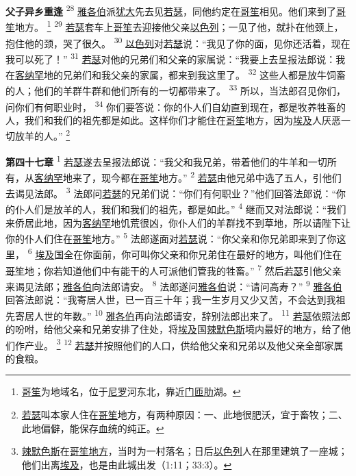 \textbf{父子异乡重逢\quad}
\textsuperscript{28}
\uline{雅各伯}派\uline{犹大}先去见\uline{若瑟}，同他约定在\uline{哥笙}相见。他们来到了\uline{哥笙}地方。
\footnote{\uline{哥笙}为地域名，位于\uline{尼罗}河东北，靠近\uline{门匝肋}湖。}
\textsuperscript{29}
\uline{若瑟}套车上\uline{哥笙}去迎接他父亲\uline{以色列}；一见了他，就扑在他颈上，抱住他的颈，哭了很久。
\textsuperscript{30}
\uline{以色列}对\uline{若瑟}说：“我见了你的面，见你还活着，现在我可以死了！”
\textsuperscript{31}
\uline{若瑟}对他的兄弟们和父亲的家属说：“我要上去呈报法郎说：我在\uline{客纳罕}地的兄弟们和我父亲的家属，都来到我这里了。
\textsuperscript{32}
这些人都是放牛饲畜的人；他们的羊群牛群和他们所有的一切都带来了。
\textsuperscript{33}
所以，当法郎召见你们，问你们有何职业时，
\textsuperscript{34}
你们要答说：你的仆人们自幼直到现在，都是牧养牲畜的人，我们和我们的祖先都是如此。这样你们才能住在\uline{哥笙}地方，因为\uline{埃及}人厌恶一切放羊的人。”
\footnote{\uline{若瑟}叫本家人住在\uline{哥笙}地方，有两种原因：一、此地很肥沃，宜于畜牧；二、此地偏僻，能保存血统的纯正。}

\textbf{第四十七章\quad}
\textsuperscript{1}
\uline{若瑟}遂去呈报法郎说：“我父和我兄弟，带着他们的牛羊和一切所有，从\uline{客纳罕}地来了，现今都在\uline{哥笙}地方。”
\textsuperscript{2}
\uline{若瑟}由他兄弟中选了五人，引他们去谒见法郎。
\textsuperscript{3}
法郎问\uline{若瑟}的兄弟们说：“你们有何职业？”他们回答法郎说：“你的仆人们是放羊的人，我们和我们的祖先，都是如此。”
\textsuperscript{4}
继而又对法郎说：“我们来侨居此地，因为\uline{客纳罕}地饥荒很凶，你仆人们的羊群找不到草地，所以请陛下让你的仆人们住在\uline{哥笙}地方。”
\textsuperscript{5}
法郎遂面对\uline{若瑟}说：“你父亲和你兄弟即来到了你这里，
\textsuperscript{6}
\uline{埃及}国全在你面前，你可叫你父亲和你兄弟住在最好的地方，叫他们住在\uline{哥笙}地；你若知道他们中有能干的人可派他们管我的牲畜。”
\textsuperscript{7}
然后\uline{若瑟}引他父亲来谒见法郎；\uline{雅各伯}向法郎请安。
\textsuperscript{8}
法郎遂问\uline{雅各伯}说：“请问高寿？”
\textsuperscript{9}
\uline{雅各伯}回答法郎说：“我寄居人世，已一百三十年；我一生岁月又少又苦，不会达到我祖先寄居人世的年数。”
\textsuperscript{10}
\uline{雅各伯}再向法郎请安，辞别法郎出来了。
\textsuperscript{11}
\uline{若瑟}依照法郎的吩咐，给他父亲和兄弟安排了住处，将\uline{埃及}国\uline{辣默}\uline{色斯}境内最好的地方，给了他们作产业。
\footnote{\uline{辣默色斯}在\uline{哥笙地方}，当时为一村落名；日后\uline{以色列}人在那里建筑了一座城；他们出离\uline{埃及}，也是由此城出发（1:11；33:3）。}
\textsuperscript{12}
\uline{若瑟}并按照他们的人口，供给他父亲和兄弟以及他父亲全部家属的食粮。

